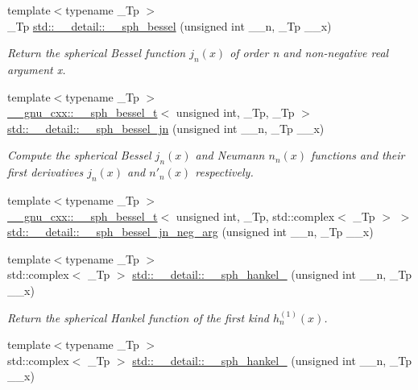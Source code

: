 \begin{DoxyCompactItemize}
{\footnotesize template$<$typename \+\_\+\+Tp $>$ }\\\+\_\+\+Tp \hyperlink{namespacestd_1_1____detail_ac2ae8a144f79bd793e1b5d80a3b082b1}{std\+::\+\_\+\+\_\+detail\+::\+\_\+\+\_\+sph\+\_\+bessel} (unsigned int \+\_\+\+\_\+n, \+\_\+\+Tp \+\_\+\+\_\+x)
\begin{DoxyCompactList}\small\item\em Return the spherical Bessel function $ j_n(x) $ of order n and non-\/negative real argument {\ttfamily x}. \end{DoxyCompactList}\item 
{\footnotesize template$<$typename \+\_\+\+Tp $>$ }\\\hyperlink{struct____gnu__cxx_1_1____sph__bessel__t}{\+\_\+\+\_\+gnu\+\_\+cxx\+::\+\_\+\+\_\+sph\+\_\+bessel\+\_\+t}$<$ unsigned int, \+\_\+\+Tp, \+\_\+\+Tp $>$ \hyperlink{namespacestd_1_1____detail_afd4f4f072924a9396676c437135c27f9}{std\+::\+\_\+\+\_\+detail\+::\+\_\+\+\_\+sph\+\_\+bessel\+\_\+jn} (unsigned int \+\_\+\+\_\+n, \+\_\+\+Tp \+\_\+\+\_\+x)
\begin{DoxyCompactList}\small\item\em Compute the spherical Bessel $ j_n(x) $ and Neumann $ n_n(x) $ functions and their first derivatives $ j_n(x) $ and $ n'_n(x) $ respectively. \end{DoxyCompactList}\item 
{\footnotesize template$<$typename \+\_\+\+Tp $>$ }\\\hyperlink{struct____gnu__cxx_1_1____sph__bessel__t}{\+\_\+\+\_\+gnu\+\_\+cxx\+::\+\_\+\+\_\+sph\+\_\+bessel\+\_\+t}$<$ unsigned int, \+\_\+\+Tp, std\+::complex$<$ \+\_\+\+Tp $>$ $>$ \hyperlink{namespacestd_1_1____detail_a8c2a1782e4030a517568aaebecb09f9d}{std\+::\+\_\+\+\_\+detail\+::\+\_\+\+\_\+sph\+\_\+bessel\+\_\+jn\+\_\+neg\+\_\+arg} (unsigned int \+\_\+\+\_\+n, \+\_\+\+Tp \+\_\+\+\_\+x)
\item 
{\footnotesize template$<$typename \+\_\+\+Tp $>$ }\\std\+::complex$<$ \+\_\+\+Tp $>$ \hyperlink{namespacestd_1_1____detail_adcc174fe4cb03d428f19abcae8012b50}{std\+::\+\_\+\+\_\+detail\+::\+\_\+\+\_\+sph\+\_\+hankel\+\_} (unsigned int \+\_\+\+\_\+n, \+\_\+\+Tp \+\_\+\+\_\+x)
\begin{DoxyCompactList}\small\item\em Return the spherical Hankel function of the first kind $ h^{(1)}_n(x) $. \end{DoxyCompactList}\item 
{\footnotesize template$<$typename \+\_\+\+Tp $>$ }\\std\+::complex$<$ \+\_\+\+Tp $>$ \hyperlink{namespacestd_1_1____detail_a89fe914f377a138d37369d13bda1162e}{std\+::\+\_\+\+\_\+detail\+::\+\_\+\+\_\+sph\+\_\+hankel\+\_} (unsigned int \+\_\+\+\_\+n, \+\_\+\+Tp \+\_\+\+\_\+x)

\end{DoxyCompactItemize}
